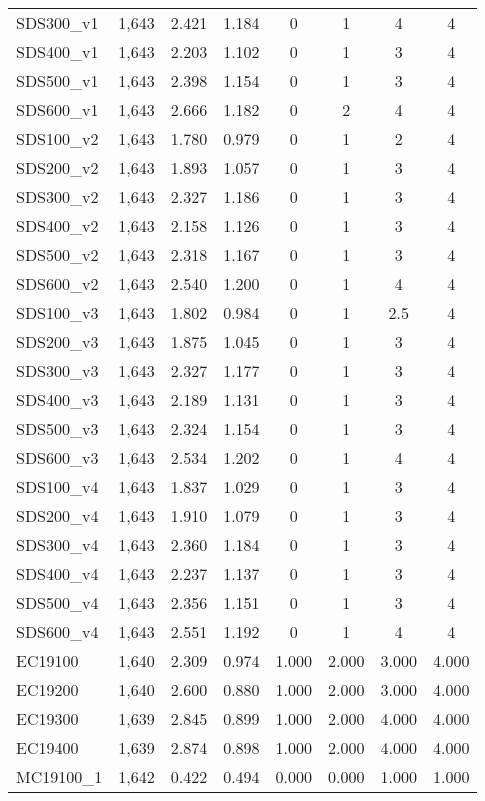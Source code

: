 \begin{table}[!htbp]
\begin{tabular}{@{\extracolsep{5pt}}lccccccc}
SDS300\_v1 & 1,643 & 2.421 & 1.184 & 0 & 1 & 4 & 4 \\ 
SDS400\_v1 & 1,643 & 2.203 & 1.102 & 0 & 1 & 3 & 4 \\ 
SDS500\_v1 & 1,643 & 2.398 & 1.154 & 0 & 1 & 3 & 4 \\ 
SDS600\_v1 & 1,643 & 2.666 & 1.182 & 0 & 2 & 4 & 4 \\ 
SDS100\_v2 & 1,643 & 1.780 & 0.979 & 0 & 1 & 2 & 4 \\ 
SDS200\_v2 & 1,643 & 1.893 & 1.057 & 0 & 1 & 3 & 4 \\ 
SDS300\_v2 & 1,643 & 2.327 & 1.186 & 0 & 1 & 3 & 4 \\ 
SDS400\_v2 & 1,643 & 2.158 & 1.126 & 0 & 1 & 3 & 4 \\ 
SDS500\_v2 & 1,643 & 2.318 & 1.167 & 0 & 1 & 3 & 4 \\ 
SDS600\_v2 & 1,643 & 2.540 & 1.200 & 0 & 1 & 4 & 4 \\ 
SDS100\_v3 & 1,643 & 1.802 & 0.984 & 0 & 1 & 2.5 & 4 \\ 
SDS200\_v3 & 1,643 & 1.875 & 1.045 & 0 & 1 & 3 & 4 \\ 
SDS300\_v3 & 1,643 & 2.327 & 1.177 & 0 & 1 & 3 & 4 \\ 
SDS400\_v3 & 1,643 & 2.189 & 1.131 & 0 & 1 & 3 & 4 \\ 
SDS500\_v3 & 1,643 & 2.324 & 1.154 & 0 & 1 & 3 & 4 \\ 
SDS600\_v3 & 1,643 & 2.534 & 1.202 & 0 & 1 & 4 & 4 \\ 
SDS100\_v4 & 1,643 & 1.837 & 1.029 & 0 & 1 & 3 & 4 \\ 
SDS200\_v4 & 1,643 & 1.910 & 1.079 & 0 & 1 & 3 & 4 \\ 
SDS300\_v4 & 1,643 & 2.360 & 1.184 & 0 & 1 & 3 & 4 \\ 
SDS400\_v4 & 1,643 & 2.237 & 1.137 & 0 & 1 & 3 & 4 \\ 
SDS500\_v4 & 1,643 & 2.356 & 1.151 & 0 & 1 & 3 & 4 \\ 
SDS600\_v4 & 1,643 & 2.551 & 1.192 & 0 & 1 & 4 & 4 \\ 
EC19100 & 1,640 & 2.309 & 0.974 & 1.000 & 2.000 & 3.000 & 4.000 \\ 
EC19200 & 1,640 & 2.600 & 0.880 & 1.000 & 2.000 & 3.000 & 4.000 \\ 
EC19300 & 1,639 & 2.845 & 0.899 & 1.000 & 2.000 & 4.000 & 4.000 \\ 
EC19400 & 1,639 & 2.874 & 0.898 & 1.000 & 2.000 & 4.000 & 4.000 \\ 
MC19100\_1 & 1,642 & 0.422 & 0.494 & 0.000 & 0.000 & 1.000 & 1.000 \\ 

\end{tabular}
\end{table}
